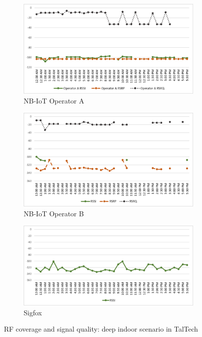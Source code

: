 \documentclass[conference,a4paper,xcolor=table]{IEEEtran}
\begin{document}
 \begin{figure}[t]
\begin{subfigure}[t]{\linewidth}
  \centering
  \includegraphics[width=.7\linewidth]{images/tallinn/ATallinnDeepIndoor.pdf}  
  \caption{NB-IoT Operator A}
\end{subfigure}
\begin{subfigure}[t]{\linewidth}
  \centering
  \includegraphics[width=.7\linewidth]{images/tallinn/BTallinnDeepIndoor.pdf}  
  \caption{NB-IoT Operator B}
  
\end{subfigure}
\begin{subfigure}[t]{\linewidth}
  \centering
  \includegraphics[width=.7\linewidth]{images/tallinn/STallinnDeepIndoor.pdf}  
\caption{Sigfox}
 \end{subfigure}
\caption{RF coverage and signal quality: deep indoor scenario in TalTech}
 \label{RFDeepIndoorTallinn}
\end{figure}
\end{document}
